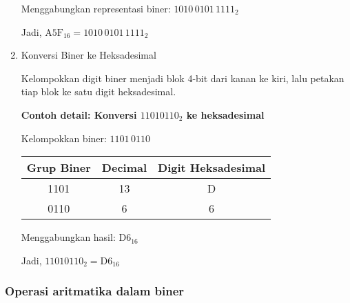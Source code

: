 \begin{enumerate}
Menggabungkan representasi biner: \(1010\,0101\,1111_2\)

Jadi, \(\mathrm{A5F}_{16} = 1010\,0101\,1111_2\)

\item{Konversi Biner ke Heksadesimal}

Kelompokkan digit biner menjadi blok 4-bit dari kanan ke kiri, lalu petakan tiap blok ke satu digit heksadesimal.

\textbf{Contoh detail: Konversi \(11010110_2\) ke heksadesimal}

Kelompokkan biner: \(1101\,0110\)

\begin{center}
\begin{tabular}{|c|c|c|}
\hline
\textbf{Grup Biner} & \textbf{Decimal} & \textbf{Digit Heksadesimal} \\
\hline
1101 & 13 & D \\
0110 & 6 & 6 \\
\hline
\end{tabular}
\end{center}

Menggabungkan hasil: \(\mathrm{D6}_{16}\)

Jadi, \(11010110_2 = \mathrm{D6}_{16}\)

\end{enumerate}

\subsubsection{Operasi aritmatika dalam biner}

